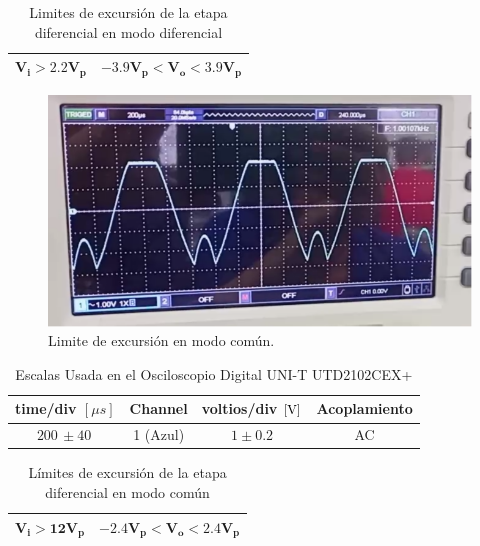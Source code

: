 \begin{enumerate}
        \begin{table}[H]
          \centering
          \begin{tabular}{|c|c|}
            \hline
            $\mathbf{V_i > 2.2 V_p}$ & $\mathbf{-3.9V_p <V_o<3.9V_p}$ \\
            \hline
          \end{tabular}
          \caption{Limites de excursión de la etapa diferencial en modo diferencial}
          \label{tab:exp_lim_exc_modif}
        \end{table}



        \begin{figure}[H]
          \centering
          \renewcommand{\figurename}{Imagen}
          \includegraphics[width=\textwidth]{Imagenes/voc.png}
          \caption{Limite de excursión en modo común.}
          \label{fig:voc}
        \end{figure}


        \begin{table}[H]
          \centering
          \begin{tabular}{|c|c|c|c|}
            \hline
            \textbf{time/div} $[\mu s]$ & \textbf{Channel} & \textbf{voltios/div $[\volt]$} & \textbf{Acoplamiento} \\ \hline
            $200 \, \pm 40 \, $         & 1 (Azul)         & $1 \pm 0.2  $                  & AC                    \\ \hline
          \end{tabular}
          \caption{Escalas Usada en el Osciloscopio Digital UNI-T UTD2102CEX+}
          \label{tab:escala_lim_modocomun}
        \end{table}

        \begin{table}[H]
          \centering
          \begin{tabular}{|c|c|}
            \hline
            $\mathbf{V_i > 12 V_p}$ & $\mathbf{-2.4V_p <V_o<2.4V_p}$ \\
            \hline
          \end{tabular}
          \caption{Límites de excursión de la etapa diferencial en modo común}
          \label{tab:exp_lim_exc_mocom}
        \end{table}

\end{enumerate}


